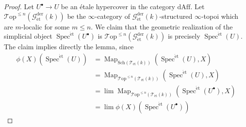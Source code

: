 \documentclass[12pt,a4paper,reqno]{amsart}
\theoremstyle{plain}
\theoremstyle{definition}
\theoremstyle{remark}
\numberwithin{equation}{section}
\begin{document}
\begin{proof}
	Let $U^\bullet \to U$ be an \'etale hypercover in the category $\mathrm{dAff}$.
	Let ${\mathcal T\mathrm{op}}^{\le n}({{\mathcal G}_{\mathrm{\acute{e}t}}^\mathrm{der}(k)})$ be the $\infty$-category of ${{\mathcal G}_{\mathrm{\acute{e}t}}^\mathrm{der}(k)}$-structured $\infty$-topoi which are $m$-localic for some $m \le n$.
	We claim that the geometric realization of the simplicial object $\operatorname{Spec}^{\mathrm{\acute{e}t}}(U^\bullet)$ is ${\mathcal T\mathrm{op}}^{\le n}({{\mathcal G}_{\mathrm{\acute{e}t}}^\mathrm{der}(k)})$ is precisely $\operatorname{Spec}^{\mathrm{\acute{e}t}}(U)$.
	The claim implies directly the lemma, since
	\begin{align*}
	\phi(X)(\operatorname{Spec}^{\mathrm{\acute{e}t}}(U)) & = \operatorname{Map}_{\mathrm{Sch}({{\mathcal T}_{\mathrm{\acute{e}t}}(k)})}(\operatorname{Spec}^{\mathrm{\acute{e}t}}(U), X) \\
	& = \operatorname{Map}_{{\mathcal T\mathrm{op}}^{\le n}({{\mathcal T}_{\mathrm{\acute{e}t}}(k)})}(\operatorname{Spec}^{\mathrm{\acute{e}t}}(U), X) \\
	& = \lim \operatorname{Map}_{{\mathcal T\mathrm{op}}^{\le n}({{\mathcal T}_{\mathrm{\acute{e}t}}(k)})}(\operatorname{Spec}^{\mathrm{\acute{e}t}}(U^\bullet), X) \\
	& = \lim \phi(X)(\operatorname{Spec}^{\mathrm{\acute{e}t}}(U^\bullet))
	\end{align*}
	

\end{proof}
\end{document}
